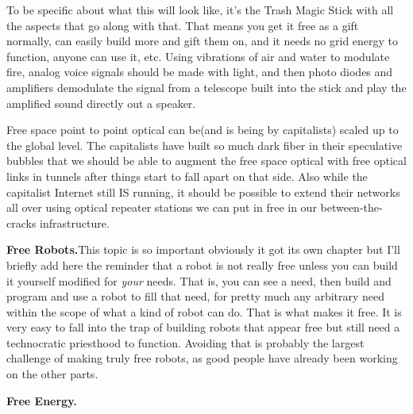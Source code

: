 To be specific about what this will look like, it's the Trash Magic
Stick with all the aspects that go along with that. That means you get
it free as a gift normally, can easily build more and gift them on, and
it needs no grid energy to function, anyone can use it, etc. Using
vibrations of air and water to modulate fire, analog voice signals
should be made with light, and then photo diodes and amplifiers
demodulate the signal from a telescope built into the stick and play the
amplified sound directly out a speaker.

Free space point to point optical can be(and is being by capitalists)
scaled up to the global level. The capitalists have built so much dark
fiber in their speculative bubbles that we should be able to augment the
free space optical with free optical links in tunnels after things start
to fall apart on that side. Also while the capitalist Internet still IS
running, it should be possible to extend their networks all over using
optical repeater stations we can put in free in our between-the-cracks
infrastructure.

\textbf{Free Robots.}This topic is so important obviously it got its own
chapter but I'll briefly add here the reminder that a robot is not
really free unless you can build it yourself modified for \emph{your}
needs. That is, you can see a need, then build and program and use a
robot to fill that need, for pretty much any arbitrary need within the
scope of what a kind of robot can do. That is what makes it free. It is
very easy to fall into the trap of building robots that appear free but
still need a technocratic priesthood to function. Avoiding that is
probably the largest challenge of making truly free robots, as good
people have already been working on the other parts.

\textbf{Free Energy.}
